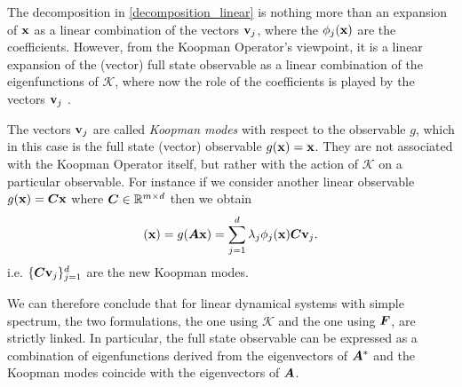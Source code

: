 The decomposition in \eqref{decomposition_linear} is nothing more than an expansion of $\vb{x}$ as a linear combination of the vectors $\vb{v}_j$, where the $\phi_j(\vb{x})$ are the coefficients. However, from the Koopman Operator's viewpoint, it is a linear expansion of the (vector) full state observable as a linear combination of the eigenfunctions of $\mathcal{K}$, where now the role of the coefficients is played by the vectors $\vb{v}_j$ \cite{rowley_spectral_2009}. 

The vectors $\vb{v}_j$ are called \emph{Koopman modes} with respect to the observable $g$, which in this case is the full state (vector) observable $g(\vb{x}) = \vb{x}$. They are not associated with the Koopman Operator itself, but rather with the action of $\mathcal{K}$ on a particular observable. For instance if we consider another linear observable $g(\vb{x}) = \vb*{C}\vb{x}$ where $\vb*{C}\in\mathbb{R}^{m \times d}$ then we obtain
\begin{equation*}
	[\mathcal{K}g](\vb{x}) = g(\vb*{A}\vb{x})  = \sum_{j=1}^d \lambda_j \phi_j(\vb{x}) \vb*{C}\vb{v}_j.
\end{equation*}
i.e. $\{\vb*{C}\vb{v}_j\}_{j = 1}^d$ are the new Koopman modes.

We can therefore conclude that for linear dynamical systems with simple spectrum, the two formulations, the one using $\mathcal{K}$ and the one using $\vb*{F}$, are strictly linked. In particular, the full state observable can be expressed as a combination of eigenfunctions derived from the eigenvectors of $\vb*{A}^*$ and the Koopman modes coincide with the eigenvectors of $\vb*{A}$. 

